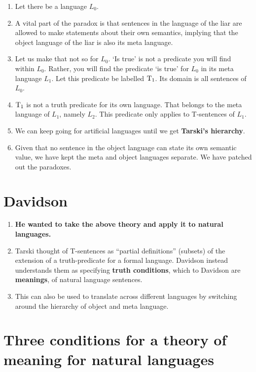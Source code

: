 \begin{enumerate}[label=(\alph*)]
  \item Let there be a language $L_0$.
  \item A vital part of the paradox is that sentences in the language of the liar are allowed to make statements about their own semantics, implying that the object language of the liar is also its meta language.
  \item Let us make that not so for $L_0$. `Is true' is not a predicate you will find within $L_0$. Rather, you will find the predicate `is true' for $L_0$ in its meta language $L_1$. Let this predicate be labelled $\mathrm{T}_1$. Its domain is all sentences of $L_0$.
  \item $\mathrm{T}_1$ is not a truth predicate for its own language. That belongs to the meta language of $L_1$, namely $L_2$. This predicate only applies to T-sentences of $L_1$.
  \item We can keep going for artificial languages until we get \textbf{Tarski's hierarchy}.
  \item Given that no sentence in the object language can state its own semantic value, we have kept the meta and object languages separate. We have patched out the paradoxes.
\end{enumerate}

\section{Davidson}

\begin{enumerate}[label=(\alph*)]
  \item \textbf{He wanted to take the above theory and apply it to natural languages.}
  \item Tarski thought of T-sentences as ``partial definitions'' (subsets) of the extension of a truth-predicate for a formal language. Davidson instead understands them as specifying \textbf{truth conditions}, which to Davidson are \textbf{meanings}, of natural language sentences.
  \item This can also be used to translate across different languages by switching around the hierarchy of object and meta language.
\end{enumerate}

\section{Three conditions for a theory of meaning for natural languages}

